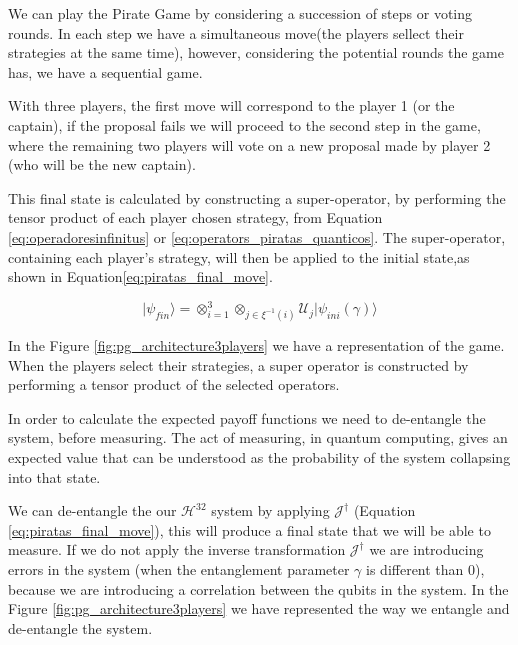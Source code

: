 We can play the Pirate Game by considering a succession of steps or voting rounds. In each step we have a simultaneous move(the players sellect their strategies at the same time), however, considering the potential rounds the game has, we have a sequential game. 

With three players, the first move will correspond to the player 1 (or the captain), if the proposal fails we will proceed to the second step in the game, where the remaining two players will vote on a new proposal made by player 2 (who will be the new captain). 

This final state is calculated by constructing a super-operator, by performing the tensor product of each player chosen strategy, from Equation \ref{eq:operadoresinfinitus} or \ref{eq:operators_piratas_quanticos}. The super-operator, containing each player's strategy, will then be applied to the initial state,as shown in Equation\ref{eq:piratas_final_move}.

\begin{equation}
\vert\psi_{fin}\rangle=\otimes_{i=1}^{3}\otimes_{j\in\xi^{-1}(i)}\mathcal{U}_{j}\vert\psi_{ini}(\gamma)\rangle
\label{eq:piratas_final_move}
\end{equation}

In the Figure \ref{fig:pg_architecture3players} we have a representation of the game. When the players  select their strategies, a super operator is constructed by performing a tensor product of the selected operators. 

In order to calculate the expected payoff functions we need to de-entangle the system, before measuring. The act of measuring, in quantum computing, gives an expected value that can be understood as the probability of the system collapsing into that state. 

We can de-entangle the our $\mathcal{H}^{32}$ system by applying $\mathcal{J}^{\dagger}$ (Equation \ref{eq:piratas_final_move}), this will produce a final state that we will be able to measure. If we do not apply the inverse transformation $\mathcal{J}^{\dagger}$ we are introducing errors in the system (when the entanglement parameter $\gamma$ is different than $0$), because we are introducing a correlation between the qubits in the system. In the Figure \ref{fig:pg_architecture3players} we have represented the way we entangle and de-entangle the system.



